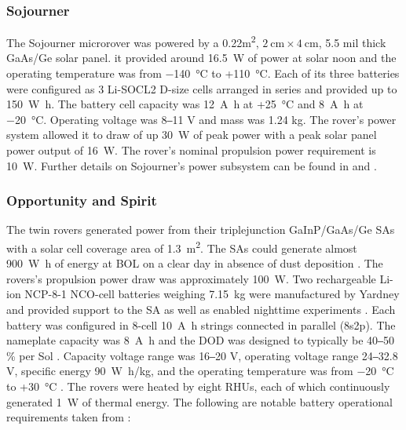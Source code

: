 \subsubsection{Sojourner}
The Sojourner microrover was powered by a 0.22\si{\meter\squared}, $\SI{2}{\centi\meter}\times\SI{4}{\centi\meter}$, 5.5 mil thick \ac{GaAs}/\ac{Ge} solar panel. it provided around \SI{16.5}{\watt} of power at solar noon and the operating temperature was from \SI{-140}{\celsius} to +\SI{110}{\celsius}. Each of its three batteries were configured as 3 \ac{Li-SOCL2} D-size cells arranged in series and provided up to \SI{150}{\watt\hour}. The battery cell capacity was \SI{12}{\ampere\hour} at +\SI{25}{\celsius} and \SI{8}{\ampere\hour} at \SI{-20}{\celsius}. Operating voltage was 8‒11 \si{\volt} and mass was 1.24 \si{\kilo\gram}. The rover's power system allowed it to draw of up \SI{30}{\watt} of peak power with a peak solar panel power output of \SI{16}{\watt}. The rover's nominal propulsion power requirement is \SI{10}{\watt}. Further details on Sojourner's power subsystem can be found in  and .

\subsubsection{Opportunity and Spirit}
The twin rovers generated power from their triplejunction \ac{GaInP}/\ac{GaAs}/\ac{Ge} \acp{SA} with a solar cell coverage area of \SI{1.3}{\square\meter}. The \acp{SA} could generate almost \SI{900}{\watt\hour} of energy at \ac{BOL} on a clear day in absence of dust deposition . The rovers's propulsion power draw was approximately \SI{100}{\watt}. Two rechargeable \ac{Li-ion} NCP-8-1 \ac{NCO}-cell batteries weighing \SI{7.15}{\kilo\gram} were manufactured by Yardney and provided support to the \ac{SA} as well as enabled nighttime experiments . Each battery was configured in 8-cell \SI{10}{\ampere\hour} strings connected in parallel (8s2p). The nameplate capacity was \SI{8}{\ampere\hour} and the \ac{DOD} was designed to typically be 40‒50 \si{\percent} per Sol . Capacity voltage range was 16‒20 \si{\volt}, operating voltage range 24‒32.8 \si{\volt}, specific energy \SI{90}{\watt\hour/\kilo\gram}, and the operating temperature was from \SI{-20}{\celsius} to +\SI{30}{\celsius} . The rovers were heated by eight \acp{RHU}, each of which continuously generated \SI{1}{\watt} of thermal energy. The following are notable battery operational requirements taken from :

